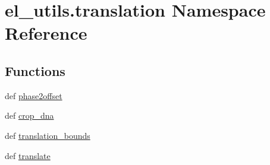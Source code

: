 \hypertarget{namespaceel__utils_1_1translation}{\section{el\-\_\-utils.\-translation Namespace Reference}
\label{namespaceel__utils_1_1translation}
}
\subsection*{Functions}
\begin{DoxyCompactItemize}
\item 
def \hyperlink{namespaceel__utils_1_1translation_a6ef56208d3a144e87bf2a91674f58f1d}{phase2offset}
\item 
def \hyperlink{namespaceel__utils_1_1translation_a7d946af8cda6b7fe1cc48dd178cda33b}{crop\-\_\-dna}
\item 
def \hyperlink{namespaceel__utils_1_1translation_ab2ba70d91db32d1ede11a14db8c0b029}{translation\-\_\-bounds}
\item 
def \hyperlink{namespaceel__utils_1_1translation_a1728074cd30b193a55812458df3e224d}{translate}
\end{DoxyCompactItemize}



